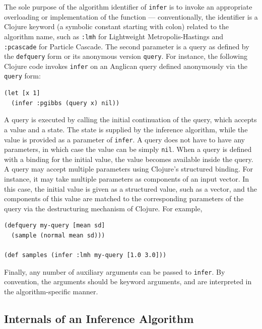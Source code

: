 \documentclass[preprint]{sigplanconf}
\begin{document}
The sole purpose of the algorithm identifier of \texttt{infer} is to invoke
an appropriate overloading or implementation of the function --- conventionally,
the identifier is a Clojure keyword (a symbolic constant starting with colon)
related to the algorithm name, such as \texttt{:lmh} for Lightweight
Metropolis-Hastings and \texttt{:pcascade} for Particle Cascade.
The second parameter is a query as defined by
the \texttt{defquery} form or its anonymous version \texttt{query}. For instance,
the following Clojure code invokes \texttt{infer} on an Anglican query
defined anonymously via the \texttt{query} form:
\begin{lstlisting}[style=default]
(let [x 1]
  (infer :pgibbs (query x) nil))
\end{lstlisting}
A query is executed by calling the initial continuation of the
query, which accepts a value and a state. The state is supplied
by the inference algorithm, while the value is provided as a
parameter of \texttt{infer}. A query does not have to have any
parameters, in which case the value can be simply \texttt{nil}.
When a query is defined with a binding for the initial value,
the value becomes available inside the query. A query may
accept multiple parameters using Clojure's structured binding.
For instance, it may take multiple parameters as components
of an input vector. In this case, the initial value is given
as a structured value, such as a vector, and the components
of this value are matched to the corresponding
parameters of the query via the destructuring mechanism of Clojure.
For example,
\begin{lstlisting}[style=default]
(defquery my-query [mean sd]
  (sample (normal mean sd)))

(def samples (infer :lmh my-query [1.0 3.0]))
\end{lstlisting}
Finally, any number of auxiliary arguments can be
passed to \texttt{infer}.
By convention, the arguments should be
keyword arguments, and are interpreted in the algorithm-specific
manner.

\subsection{Internals of an Inference Algorithm}
\label{seq:internals}
\end{document}
